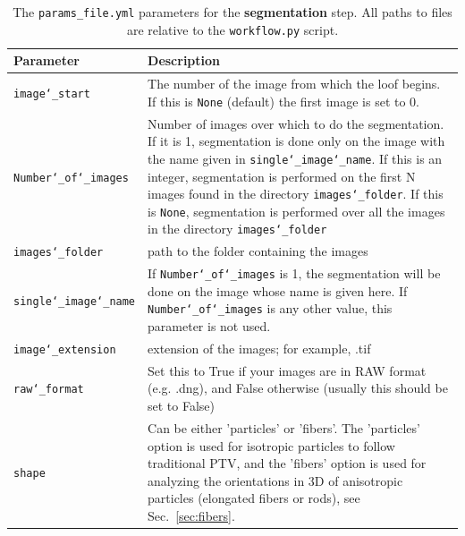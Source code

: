 \documentclass[10pt,a4paper]{article}
\begin{document}
  






\begin{table}[!ht]
	\centering
	\caption{The \texttt{params\_file.yml} parameters for the \textbf{segmentation} step. All paths to files are relative to the \texttt{workflow.py} script. \label{tab:segment_params}}
	\begin{tabular}{l m{13cm}}
		\hline
		Parameter & Description\\
		\hline
		
		\texttt{image\char`_start} & The number of the image from which the loof begins. If this is \texttt{None} (default) the first image is set to 0.\\[.3em]
		
		\texttt{Number\char`_of\char`_images} & Number of images over which to do the segmentation. If it is 1, segmentation is done only on the image with the name given in \texttt{single\char`_image\char`_name}. If this is an integer, segmentation is performed on the first N images found in the directory \texttt{images\char`_folder}. If this is \texttt{None}, segmentation is performed over all the images in the directory \texttt{images\char`_folder} \\[.3em]
		
		\texttt{images\char`_folder} & path to the folder containing the images\\[.3em]
		
		\texttt{single\char`_image\char`_name} & If \texttt{Number\char`_of\char`_images} is 1, the segmentation will be done on the image whose name is given here. If \texttt{Number\char`_of\char`_images} is any other value, this parameter is not used. \\[.3em]
		
		\texttt{image\char`_extension} & extension of the images; for example, .tif\\[.3em]
		
		\texttt{raw\char`_format} & Set this to True if your images are in RAW format (e.g. .dng), and False otherwise (usually this should be set to False)\\[.3em]
		
		\texttt{shape} & Can be either 'particles' or 'fibers'. The 'particles' option is used for isotropic particles to follow traditional PTV, and the 'fibers' option is used for analyzing the orientations in 3D of anisotropic particles (elongated fibers or rods), see Sec.~\ref{sec:fibers}. \\[.3em]
		

\end{tabular}
\end{table}
\end{document}

